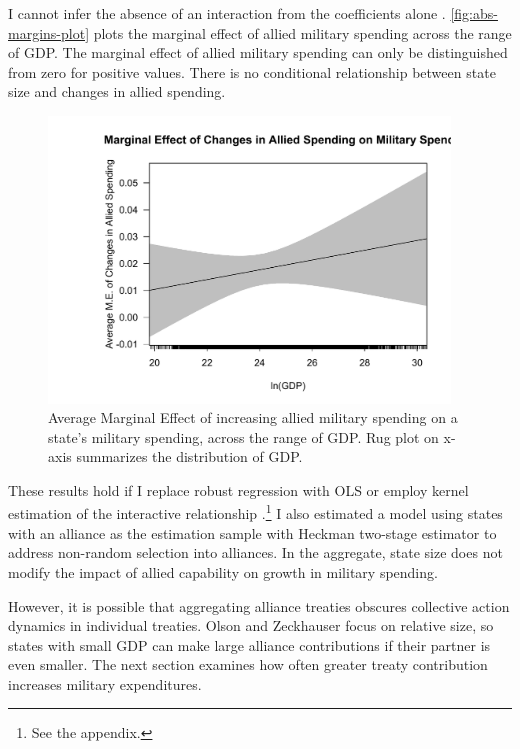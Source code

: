 \documentclass[12pt]{article}
\begin{document}
I cannot infer the absence of an interaction from the coefficients alone \citep{BramborClarkGolder2006}. 
\autoref{fig:abs-margins-plot} plots the marginal effect of allied military spending across the range of GDP. 
The marginal effect of allied military spending can only be distinguished from zero for positive values. 
There is no conditional relationship between state size and changes in allied spending. 


\begin{figure}
	\centering
		\includegraphics[width=0.95\textwidth]{abs-margins-plot.pdf}
	\caption{Average Marginal Effect of increasing allied military spending on a state's military spending, across the range of GDP. Rug plot on x-axis summarizes the distribution of GDP.}
		\label{fig:abs-margins-plot}
\end{figure}


These results hold if I replace robust regression with OLS or employ kernel estimation of the interactive relationship \citep{Hainmuelleretal2019}.\footnote{See the appendix.} 
I also estimated a model using states with an alliance as the estimation sample with Heckman two-stage estimator to address non-random selection into alliances. 
In the aggregate, state size does not modify the impact of allied capability on growth in military spending. 


However, it is possible that aggregating alliance treaties obscures collective action dynamics in individual treaties. 
Olson and Zeckhauser focus on relative size, so states with small GDP can make large alliance contributions if their partner is even smaller. 
The next section examines how often greater treaty contribution increases military expenditures. 
\end{document}
